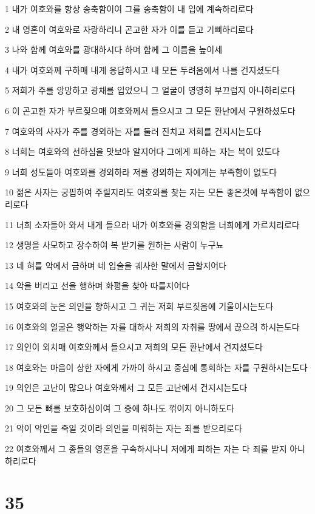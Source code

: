 \par 1 내가 여호와를 항상 송축함이여 그를 송축함이 내 입에 계속하리로다
\par 2 내 영혼이 여호와로 자랑하리니 곤고한 자가 이를 듣고 기뻐하리로다
\par 3 나와 함께 여호와를 광대하시다 하며 함께 그 이름을 높이세
\par 4 내가 여호와께 구하매 내게 응답하시고 내 모든 두려움에서 나를 건지셨도다
\par 5 저희가 주를 앙망하고 광채를 입었으니 그 얼굴이 영영히 부끄럽지 아니하리로다
\par 6 이 곤고한 자가 부르짖으매 여호와께서 들으시고 그 모든 환난에서 구원하셨도다
\par 7 여호와의 사자가 주를 경외하는 자를 둘러 진치고 저희를 건지시는도다
\par 8 너희는 여호와의 선하심을 맛보아 알지어다 그에게 피하는 자는 복이 있도다
\par 9 너희 성도들아 여호와를 경외하라 저를 경외하는 자에게는 부족함이 없도다
\par 10 젊은 사자는 궁핍하여 주릴지라도 여호와를 찾는 자는 모든 좋은것에 부족함이 없으리로다
\par 11 너희 소자들아 와서 내게 들으라 내가 여호와를 경외함을 너희에게 가르치리로다
\par 12 생명을 사모하고 장수하여 복 받기를 원하는 사람이 누구뇨
\par 13 네 혀를 악에서 금하며 네 입술을 궤사한 말에서 금할지어다
\par 14 악을 버리고 선을 행하며 화평을 찾아 따를지어다
\par 15 여호와의 눈은 의인을 향하시고 그 귀는 저희 부르짖음에 기울이시는도다
\par 16 여호와의 얼굴은 행악하는 자를 대하사 저희의 자취를 땅에서 끊으려 하시는도다
\par 17 의인이 외치매 여호와께서 들으시고 저희의 모든 환난에서 건지셨도다
\par 18 여호와는 마음이 상한 자에게 가까이 하시고 중심에 통회하는 자를 구원하시는도다
\par 19 의인은 고난이 많으나 여호와께서 그 모든 고난에서 건지시는도다
\par 20 그 모든 뼈를 보호하심이여 그 중에 하나도 꺾이지 아니하도다
\par 21 악이 악인을 죽일 것이라 의인을 미워하는 자는 죄를 받으리로다
\par 22 여호와께서 그 종들의 영혼을 구속하시나니 저에게 피하는 자는 다 죄를 받지 아니하리로다

\chapter{35}

